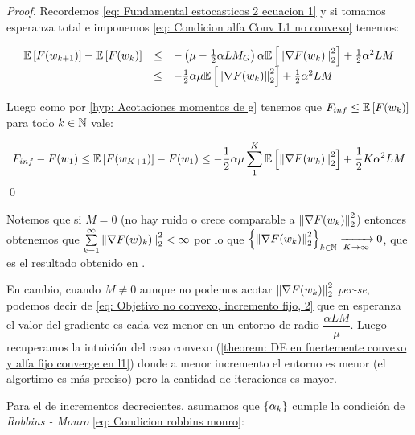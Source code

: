 \begin{proof}
	Recordemos \ref{eq: Fundamental estocasticos 2 ecuacion 1} y si tomamos esperanza total e imponemos \ref{eq: Condicion alfa Conv L1 no convexo} tenemos:
	
	\begin{equation*}
	\begin{array}{rcl}
	\mathbb{E} \left[F(w_{k+1})\right] - \mathbb{E} \left[F(w_k)\right] & \leq & - \left(\mu - \frac{1}{2}\alpha L M_G \right) \alpha \mathbb{E} \left[\left\lVert\nabla F(w_k)\right\rVert_2^2\right] + \frac{1}{2} \alpha^2 LM \\
	& \leq & - \frac{1}{2}\alpha \mu \mathbb{E} \left[\left\lVert\nabla F(w_k)\right\rVert_2^2\right] + \frac{1}{2} \alpha^2 LM
	\end{array}
	\end{equation*}
	
	Luego como por \ref{hyp: Acotaciones momentos de g} tenemos que $F_{inf} \leq \mathbb{E} \left[F(w_k)\right]$ para todo $k \in {\mathbb{N}}$ vale:
	
	\begin{equation*}
		F_{inf} - F(w_1) \leq \mathbb{E} \left[F(w_{K+1})\right] - F(w_1) \leq  - \frac{1}{2}\alpha \mu \sum\limits_{1}^{K}{\mathbb{E} \left[\left\lVert\nabla F(w_k)\right\rVert_2^2\right]} + \frac{1}{2} K \alpha^2 LM
	\end{equation*}
	\qed
\end{proof}

\begin{remark}
	Notemos que si $M=0$ (no hay ruido o crece comparable a $\left\lVert\nabla F(w_k)\right\rVert^2_2$) entonces obtenemos que $\sum\limits_{k=1}^{\infty} {\left\lVert\nabla F (w)_k)\right\rVert_2^2} < \infty$ por lo que $\left\lbrace\left\lVert\nabla F (w_k)\right\rVert_2^2\right\rbrace_{k \in {\mathbb{N}}} \xrightarrow[K \rightarrow \infty]{} 0 $, que es el resultado obtenido en \cite{nesterov:2004}.
	
	En cambio, cuando $M \neq 0$ aunque no podemos acotar $\left\lVert\nabla F (w_k)\right\rVert_2^2$ \textit{per-se}, podemos decir de \ref{eq: Objetivo no convexo, incremento fijo, 2} que en esperanza el valor del gradiente es cada vez menor en un entorno de radio $\dfrac{\alpha LM}{\mu}$. Luego recuperamos la intuici\'on del caso convexo (\ref{theorem: DE en fuertemente convexo y alfa fijo converge en l1}) donde a menor incremento el entorno es menor (el algortimo es m\'as preciso) pero la cantidad de iteraciones es mayor.
\end{remark}

Para el de incrementos decrecientes, asumamos que $\left\lbrace\alpha_k\right\rbrace$ cumple la condici\'on de \textit{Robbins - Monro} \ref{eq: Condicion robbins monro}:

